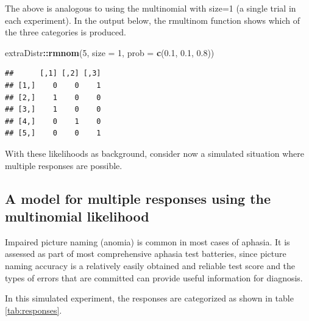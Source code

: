 \documentclass[12pt,]{krantz}
\newenvironment{Shaded}{\begin{snugshade}}{\end{snugshade}}
\newcommand{\KeywordTok}[1]{\textcolor[rgb]{0.13,0.29,0.53}{\textbf{#1}}}
\newcommand{\DataTypeTok}[1]{\textcolor[rgb]{0.13,0.29,0.53}{#1}}
\newcommand{\DecValTok}[1]{\textcolor[rgb]{0.00,0.00,0.81}{#1}}
\newcommand{\FloatTok}[1]{\textcolor[rgb]{0.00,0.00,0.81}{#1}}
\newcommand{\OperatorTok}[1]{\textcolor[rgb]{0.81,0.36,0.00}{\textbf{#1}}}
\newcommand{\NormalTok}[1]{#1}
\theoremstyle{definition}
\theoremstyle{definition}
\theoremstyle{definition}
\theoremstyle{remark}
\begin{document}
The above is analogous to using the multinomial with size=1 (a single
trial in each experiment). In the output below, the rmultinom function
shows which of the three categories is produced.

\begin{Shaded}
\begin{Highlighting}[]
\NormalTok{extraDistr}\OperatorTok{::}\KeywordTok{rmnom}\NormalTok{(}\DecValTok{5}\NormalTok{, }\DataTypeTok{size =} \DecValTok{1}\NormalTok{, }\DataTypeTok{prob =} \KeywordTok{c}\NormalTok{(}\FloatTok{0.1}\NormalTok{, }\FloatTok{0.1}\NormalTok{, }\FloatTok{0.8}\NormalTok{))}
\end{Highlighting}
\end{Shaded}

\begin{verbatim}
##      [,1] [,2] [,3]
## [1,]    0    0    1
## [2,]    1    0    0
## [3,]    1    0    0
## [4,]    0    1    0
## [5,]    0    0    1
\end{verbatim}

With these likelihoods as background, consider now a simulated situation
where multiple responses are possible.

\subsection{A model for multiple responses using the multinomial
likelihood}\label{sec:mult}

Impaired picture naming (anomia) is common in most cases of aphasia. It
is assessed as part of most comprehensive aphasia test batteries, since
picture naming accuracy is a relatively easily obtained and reliable
test score and the types of errors that are committed can provide useful
information for diagnosis.

In this simulated experiment, the responses are categorized as shown in
table \ref{tab:responses}.
\end{document}
